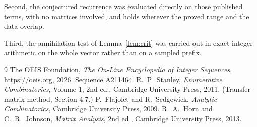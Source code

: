 \documentclass[11pt,a4paper]{article}
\theoremstyle{plain}
\theoremstyle{definition}
\begin{document}
Second, the conjectured recurrence was evaluated directly on those published terms, with no
matrices involved, and holds wherever the proved range and the data overlap.

Third, the annihilation test of Lemma~\ref{lem:crit} was carried out in exact integer
arithmetic on the whole vector rather than on a sampled prefix.

\begin{thebibliography}{9}
 The OEIS Foundation, \emph{The On-Line Encyclopedia of Integer
Sequences}, \url{https://oeis.org}, 2026. Sequence A211464.
 R.~P.~Stanley, \emph{Enumerative Combinatorics}, Volume 1, 2nd ed.,
Cambridge University Press, 2011. (Transfer-matrix method, Section 4.7.)
 P.~Flajolet and R.~Sedgewick, \emph{Analytic Combinatorics}, Cambridge
University Press, 2009.
 R.~A.~Horn and C.~R.~Johnson, \emph{Matrix Analysis}, 2nd ed., Cambridge
University Press, 2013.
\end{thebibliography}
\end{document}
